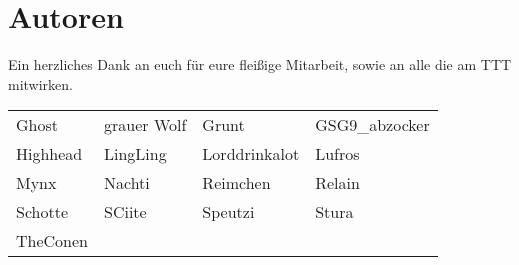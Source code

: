 \pagebreak
\chapter*{Autoren}
	Ein herzliches Dank an euch für eure fleißige Mitarbeit, sowie an alle die am \ac{TTT} mitwirken.\\ 
	
	\begin{tabular}{p{}p{}p{}p{}}
		Ghost & 
		grauer Wolf &
		Grunt &
		GSG9\_abzocker\\
		Highhead &
		LingLing & 
		Lorddrinkalot &
		Lufros\\
		Mynx &
		Nachti &
		Reimchen &
		Relain\\
		Schotte &
		SCiite &
		Speutzi &
		Stura \\
		TheConen\\
	\end{tabular}	